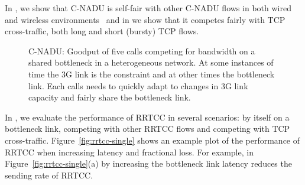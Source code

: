 In , we show that C-NADU is self-fair with other C-NADU flows
in both wired and wireless environments~\cite{singh:2010.thesis} and in
 we show that it competes fairly with TCP cross-traffic, both
long and short (bursty) TCP flows.

\begin{figure}
\centerline{
{}
{}
}
\centerline{
{}
{}
}
\caption{C-NADU: Goodput of five calls competing for bandwidth on a shared
bottleneck in a heterogeneous network. At some instances of time the 3G link
is the constraint and at other times the bottleneck link. Each calls needs to
quickly adapt to changes in 3G link capacity and fairly share the bottleneck
link.}
\label{fig:hetrc}
\end{figure}

\begin{table}
\caption{C-NADU: Five calls in a heterogeneous network with end-to-end latency
between \emph{60-120ms} and 0.5\% link-layer losses.}
\label{table:hetrc}
\end{table}

In , we evaluate the performance of RRTCC in several
scenarios: by itself on a bottleneck link, competing with other RRTCC flows
and competing with TCP cross-traffic. Figure~\ref{fig:rrtcc-single} shows an
example plot of the performance of RRTCC when increasing latency and
fractional loss. For example, in Figure~\ref{fig:rrtcc-single}(a) by
increasing the bottleneck link latency reduces the sending rate of RRTCC.

